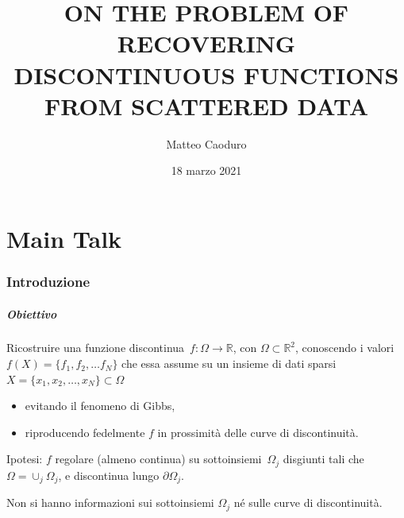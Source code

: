\documentclass[10pt]{beamer}
\title{ON THE PROBLEM OF RECOVERING\\
	  DISCONTINUOUS FUNCTIONS\\
	  FROM SCATTERED DATA}
\author{Matteo Caoduro}
\date{18 marzo 2021}
\institute{\normalsize \emph{Relatore:} Prof.ssa\, Milvia Francesca Rossini}
\theoremstyle{definition}
\theoremstyle{plain}
\def\R{\mathbb R}
\def\line#1{\hbox to\hsize{#1}}
\begin{document}
\begin{frame}
  \titlepage
\end{frame}



\part<presentation>{Main Talk}

\section{Introduzione}




\begin{frame}
\frametitle{Obiettivo}
Ricostruire  una \alert{funzione discontinua}~$f:\Omega\to\R$, con $\Omega\subset\R^2$, conoscendo i valori $f(X) = \{f_1,f_2,\dots f_N\}$ che essa assume su un insieme di \alert{dati sparsi} $X=\{x_1,x_2,\dots,x_N\}\subset\Omega$

\begin{itemize}
\item evitando il fenomeno di Gibbs,
\item riproducendo fedelmente $f$ in prossimità delle curve di discontinuità.
\end{itemize}

\bigskip
\alert{Ipotesi}: $f$ regolare (almeno continua) su sottoinsiemi~$\Omega_j$ disgiunti tali che $\Omega = \cup_j \Omega_j$, e discontinua lungo $\partial \Omega_j$.

\medskip
Non si hanno informazioni sui sottoinsiemi $\Omega_j$ né sulle curve di discontinuità.



\end{frame}
\end{document}
